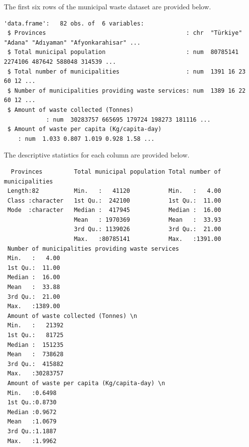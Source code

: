 \documentclass[
  11pt,
  a4paper,
  DIV=11,
  numbers=noendperiod]{scrartcl}
\begin{document}
The first six rows of the municipal waste dataset are provided below.

\begin{verbatim}
'data.frame':   82 obs. of  6 variables:
 $ Provinces                                        : chr  "Türkiye" "Adana" "Adıyaman" "Afyonkarahisar" ...
 $ Total municipal population                       : num  80785141 2274106 487642 588048 314539 ...
 $ Total number of municipalities                   : num  1391 16 23 60 12 ...
 $ Number of municipalities providing waste services: num  1389 16 22 60 12 ...
 $ Amount of waste collected (Tonnes) 
            : num  30283757 665695 179724 198273 181116 ...
 $ Amount of waste per capita (Kg/capita-day) 
    : num  1.033 0.807 1.019 0.928 1.58 ...
\end{verbatim}

The descriptive statistics for each column are provided below.

\begin{verbatim}
  Provinces         Total municipal population Total number of municipalities
 Length:82          Min.   :   41120           Min.   :   4.00               
 Class :character   1st Qu.:  242100           1st Qu.:  11.00               
 Mode  :character   Median :  417945           Median :  16.00               
                    Mean   : 1970369           Mean   :  33.93               
                    3rd Qu.: 1139026           3rd Qu.:  21.00               
                    Max.   :80785141           Max.   :1391.00               
 Number of municipalities providing waste services
 Min.   :   4.00                                  
 1st Qu.:  11.00                                  
 Median :  16.00                                  
 Mean   :  33.88                                  
 3rd Qu.:  21.00                                  
 Max.   :1389.00                                  
 Amount of waste collected (Tonnes) \n
 Min.   :   21392                     
 1st Qu.:   81725                     
 Median :  151235                     
 Mean   :  738628                     
 3rd Qu.:  415882                     
 Max.   :30283757                     
 Amount of waste per capita (Kg/capita-day) \n
 Min.   :0.6498                               
 1st Qu.:0.8730                               
 Median :0.9672                               
 Mean   :1.0679                               
 3rd Qu.:1.1887                               
 Max.   :1.9962                               
\end{verbatim}
\end{document}
